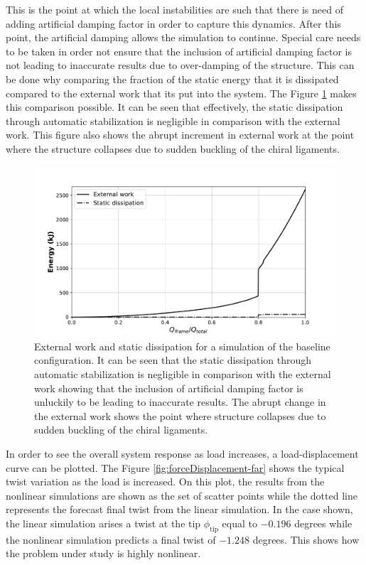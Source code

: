  This is the point at which the local instabilities are such that there is need of adding artificial damping factor in order to capture this dynamics. After this point, the artificial damping allows the simulation to continue. Special care needs to be taken in order not ensure that the inclusion of artificial damping factor is not leading to inaccurate results due to over-damping of the structure. This can be done why comparing the fraction of the static energy that it is dissipated compared to the external work that its put into the system. The Figure \ref{fig:energy} makes this comparison possible. It can be seen that effectively, the static dissipation through automatic stabilization is negligible in comparison with the external work. This figure also shows the abrupt increment in external work at the point where the structure collapses due to sudden buckling of the chiral ligaments.

  \begin{figure}[!htpb] %
    \centering
    \includegraphics[width=0.8 \textwidth]{../figures/result-sim/energy}
    \caption[External work and static dissipation for a simulation of the baseline configuration]{External work and static dissipation for a simulation of the baseline configuration. It can be seen that the static dissipation through automatic stabilization is negligible in comparison with the external work showing that the inclusion of artificial damping factor is unluckily to be leading to inaccurate results. The abrupt change in the external work shows the point where structure collapses due to sudden buckling of the chiral ligaments.}\label{fig:energy}
  \end{figure}

  In order to see the overall system response as load increases, a load-displacement curve can be plotted. The Figure \ref{fig:forceDisplacement-far} shows the typical twist variation as the load is increased. On this plot, the results from the nonlinear simulations are shown as the set of scatter points while the dotted line represents the forecast final twist from the linear simulation. In the case shown, the linear simulation arises a twist at the tip $\phi_{\mathrm{tip}}$ equal to $-0.196$ degrees while the nonlinear simulation predicts a final twist of $-1.248$ degrees. This shows how the problem under study is highly nonlinear.

